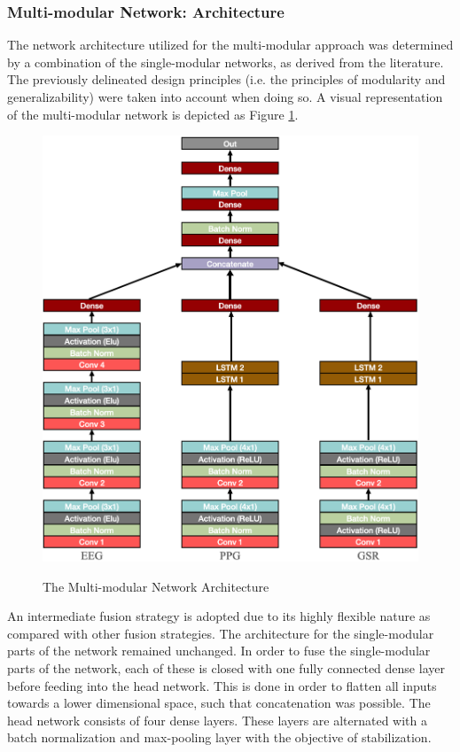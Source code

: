 \documentclass[12pt]{article}
\begin{document}
\subsubsection{Multi-modular Network: Architecture}
The network architecture utilized for the multi-modular approach was determined by a combination of the single-modular networks, as derived from the literature. The previously delineated design principles (i.e. the principles of modularity and generalizability) were taken into account when doing so. A visual representation of the multi-modular network is depicted as Figure \ref{fig:multiarchitecture}.

\begin{figure}
\caption{The Multi-modular Network Architecture}
\bigskip
\includegraphics[scale=0.725]{multi_model_architecture}
\label{fig:multiarchitecture}
\end{figure}

An intermediate fusion strategy is adopted due to its highly flexible nature as compared with other fusion strategies. The architecture for the single-modular parts of the network remained unchanged. In order to fuse the  single-modular parts of the network, each of these is closed with one fully connected dense layer before feeding into the head network. This is done in order to flatten all inputs towards a lower dimensional space, such that concatenation was possible. The head network consists of four dense layers. These layers are alternated with a batch normalization and max-pooling layer with the objective of stabilization. 
\end{document}
